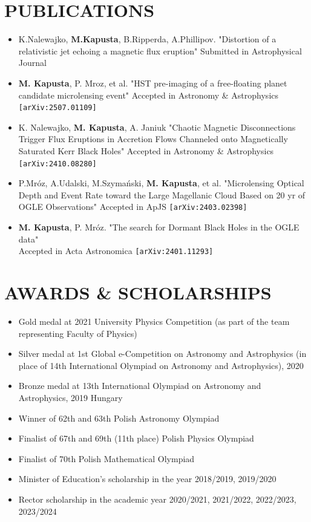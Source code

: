\documentclass[margin, 10pt]{res} %
\begin{document}
\begin{resume}
\section{PUBLICATIONS}
    \begin{itemize}
        \item K.Nalewajko, \textbf{M.Kapusta}, B.Ripperda, A.Phillipov. "Distortion of a relativistic jet echoing a magnetic flux eruption"
        Submitted in Astrophysical Journal
        \item \textbf{M. Kapusta}, P. Mroz, et al. "HST pre-imaging of a free-floating planet candidate microlensing event"
        Accepted in Astronomy \& Astrophysics \texttt{[arXiv:2507.01109]}
        \item K. Nalewajko, \textbf{M. Kapusta}, A. Janiuk "Chaotic Magnetic Disconnections Trigger Flux Eruptions in Accretion Flows Channeled onto Magnetically Saturated Kerr Black Holes"
        Accepted in Astronomy \& Astrophysics \texttt{[arXiv:2410.08280]}
        \item P.Mróz, A.Udalski, M.Szymański, \textbf{M. Kapusta}, et al. "Microlensing Optical Depth and Event Rate toward the Large Magellanic Cloud Based on 20 yr of OGLE Observations"
        Accepted in ApJS \texttt{[arXiv:2403.02398]}
        \item \textbf{M. Kapusta}, P. Mróz. "The search for Dormant Black Holes in the OGLE data"\\ Accepted in Acta Astronomica \texttt{[arXiv:2401.11293]}

    \end{itemize}


    \section{AWARDS \& SCHOLARSHIPS}

    \begin{itemize}
        \item Gold medal at 2021 University Physics Competition (as part of the team representing Faculty of Physics)
        \item Silver medal at 1st Global e-Competition on Astronomy and Astrophysics (in place of 14th International Olympiad on Astronomy and Astrophysics), 2020
        \item Bronze medal at 13th International Olympiad on Astronomy and Astrophysics, 2019 Hungary
        \item Winner of 62th and 63th Polish Astronomy Olympiad
        \item Finalist of 67th and 69th (11th place) Polish Physics Olympiad
        \item Finalist of 70th Polish Mathematical Olympiad
        \item Minister of Education’s scholarship in the year 2018/2019, 2019/2020
        \item Rector scholarship in the academic year 2020/2021, 2021/2022, 2022/2023, 2023/2024
    \end{itemize}


\end{resume}
\end{document}
